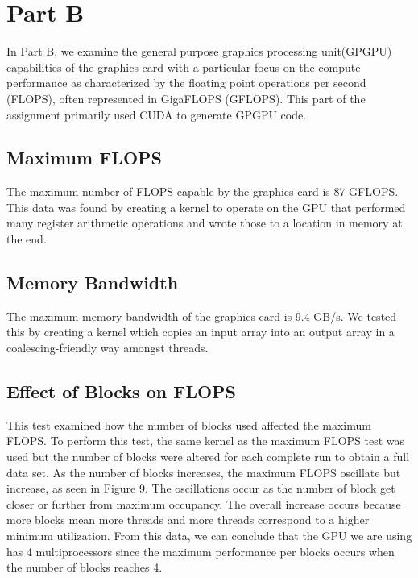 \documentclass[12pt] {article}
\begin{document}
\clearpage
\newpage
\section{Part B}
In Part B, we examine the general purpose graphics processing unit(GPGPU) capabilities of the graphics card with a particular focus on the compute performance as characterized by the floating point operations per second (FLOPS), often represented in GigaFLOPS (GFLOPS). This part of the assignment primarily used CUDA to generate GPGPU code.


\subsection{Maximum FLOPS}
The maximum number of FLOPS capable by the graphics card is 87 GFLOPS. This data was found by creating a kernel to operate on the GPU that performed many register arithmetic operations and wrote those to a location in memory at the end.


\subsection{Memory Bandwidth}
The maximum memory bandwidth of the graphics card is 9.4 GB/s. We tested this by creating a kernel which copies an input array into an output array in a coalescing-friendly way amongst threads.

\newpage
\subsection{Effect of Blocks on FLOPS}
This test examined how the number of blocks used affected the maximum FLOPS. To perform this test, the same kernel as the maximum FLOPS test was used but the number of blocks were altered for each complete run to obtain a full data set. As the number of blocks increases, the maximum FLOPS oscillate but increase, as seen in Figure 9. The oscillations occur as the number of block get closer or further from maximum occupancy. The overall increase occurs because more blocks mean more threads and more threads correspond to a higher minimum utilization. From this data, we can conclude that the GPU we are using has 4 multiprocessors since the maximum performance per blocks occurs when the number of blocks reaches 4.
\end{document}
